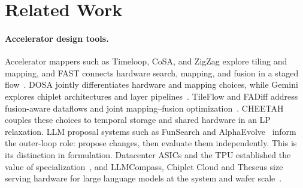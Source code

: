 \section{Related Work}
\label{app:related_work}\label{related_work_appendix}\label{sec:related}
\paragraph{Accelerator design tools.}
Accelerator mappers such as Timeloop, CoSA, and ZigZag explore tiling and mapping, and FAST connects hardware search, mapping, and fusion in a staged flow~\citep{timeloop,huang2021cosaschedulingconstrainedoptimization,mei2021zigzag,zhang_fast}.
DOSA jointly differentiates hardware and mapping choices, while Gemini explores chiplet architectures and layer pipelines~\citep{hong2023dosa,cai2024gemini}.
TileFlow and FADiff address fusion-aware dataflows and joint mapping--fusion optimization~\citep{zheng2023tileflow,jia2025fadifffusionawaredifferentiableoptimization}.
CHEETAH couples these choices to temporal storage and shared hardware in an LP relaxation.
LLM proposal systems such as FunSearch and AlphaEvolve~\citep{romera2024mathematical,novikov2025alphaevolvecodingagentscientific} inform the outer-loop role: propose changes, then evaluate them independently.
This is its distinction in formulation.
Datacenter ASICs and the TPU established the value of specialization~\citep{jouppi2017datacenter,magaki2016asic,xie2018extreme}, and LLMCompass, Chiplet Cloud and Theseus size serving hardware for large language models at the system and wafer scale~\citep{zhang2024llmcompass,peng2024chipletcloudbuildingai,zhu2024theseusexploringefficientwaferscale}.

